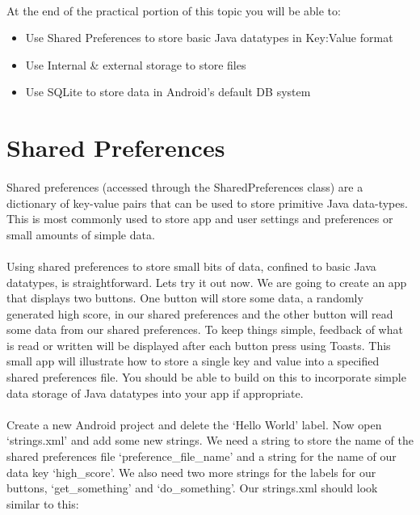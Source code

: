 \documentclass[12pt, a4paper, twoside]{book}
\begin{document}
\paragraph{} At the end of the practical portion of this topic you will be able to:

\begin{itemize}
\item Use Shared Preferences to store basic Java datatypes in Key:Value format
\item Use Internal \& external storage to store files
\item Use SQLite to store data in Android's default DB system
\end{itemize}

\section{Shared Preferences}
\paragraph{} Shared preferences (accessed through the SharedPreferences class) are a dictionary of key-value pairs that can be used to store primitive Java data-types. This is most commonly used to store app and user settings and preferences or small amounts of simple data. 

\paragraph{} Using shared preferences to store small bits of data, confined to basic Java datatypes, is straightforward. Lets try it out now.  We are going to create an app that displays two buttons. One button will store some data, a randomly generated high score, in our shared preferences and the other button will read some data from our shared preferences. To keep things simple, feedback of what is read or written will be displayed after each button press using Toasts. This small app will illustrate how to store a single key and value into a specified shared preferences file. You should be able to build on this to incorporate simple data storage of Java datatypes into your app if appropriate.

\paragraph{} Create a new Android project and delete the `Hello World' label. Now open `strings.xml' and add some new strings. We need a string to store the name of the shared preferences file `preference\_file\_name' and a string for the name of our data key `high\_score'. We also need two more strings for the labels for our buttons, `get\_something' and `do\_something'. Our strings.xml should look similar to this:
\end{document}
